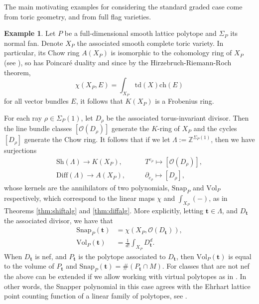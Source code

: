 \documentclass[oneside]{amsart}
\theoremstyle{plain}
\theoremstyle{definition}
\newtheorem{example}[theorem]{Example}
\newcommand{\Z}{{\mathbb{Z}}}
\newcommand{\cO}{{\mathcal{O}}}
\newcommand{\Diff}{{\mathrm{Diff}}}
\newcommand{\Vol}{{\mathrm{Vol}}}
\newcommand{\Snap}{{\mathrm{Snap}}}
\newcommand{\Sh}{{\mathrm{Sh}}}
\newcommand{\ch}{{\mathrm{ch}}}
\newcommand{\td}{{\mathrm{td}}}
\begin{document}
The main motivating examples for considering the standard graded case come from toric geometry, and from full flag varieties.
\begin{example}
    \label{example:toric}
    Let $P$ be a full-dimensional smooth lattice polytope and $\Sigma_P$ its normal fan. Denote $X_P$ the associated smooth complete toric variety. In particular, its Chow ring
    $A(X_P)$ is isomorphic to the cohomology ring of $X_P$ (see \cite[\S 5.2]{fulton93}), so has Poincar\'e duality and since by the Hirzebruch-Riemann-Roch theorem,
    \[\chi(X_P, E) = \int_{X_P} \td(X) \ch(E)\]
    for all vector bundles $E$, it follows that $K(X_P)$ is a Frobenius ring.

    For each ray $\rho \in \Sigma_P(1)$, let $D_\rho$ be the associated torus-invariant divisor.
    Then the line bundle classes $[\cO(D_\rho)]$ generate the $K$-ring of $X_P$ and
    the cycles $[D_\rho]$ generate the Chow ring.
    It follows that if we let $\Lambda := \Z^{\Sigma_P(1)}$, then we have surjections
    \begin{align*}
        \Sh(\Lambda) \to K(X_P),& \qquad T^{e_\rho} \mapsto [\cO(D_\rho)], \\
        \Diff(\Lambda) \to A(X_P),& \qquad \partial_{e_\rho} \mapsto [D_\rho],
    \end{align*}
    whose kernels are the annihilators of two polynomials, $\Snap_P$ and $\Vol_P$ respectively, which correspond to the linear maps $\chi$ and $\int_{X_P}(-)$,
    as in Theorems \ref{thm:shiftalg} and \ref{thm:diffalg}.
    More explicitly, letting $\mathbf{t} \in \Lambda$, and $D_\mathbf{t}$ the associated divisor, we have that 
    \begin{align*}
        \Snap_P(\mathbf{t}) &= \chi(X_P, \cO(D_\mathbf{t})), \\
        \Vol_P(\mathbf{t}) &= \frac{1}{d!} \int_{X_P}D_{\mathbf{t}}^d.
    \end{align*}
    When $D_\mathbf{t}$ is nef, and $P_{\mathbf t}$ is the polytope associated to $D_\mathbf{t}$, then 
    $\Vol_P(\mathbf{t})$
    is equal to the volume of $P_{\mathbf t}$ and
    $\Snap_P(\mathbf{t}) = \#(P_{\mathbf t} \cap M)$.
    For classes that are not nef the above can be extended if we allow working with virtual polytopes as in \cite{PK92}.
    In other words, the Snapper polynomial in this case agrees with the Ehrhart lattice point counting function of a linear family of polytopes, see .
\end{example}
\end{document}
